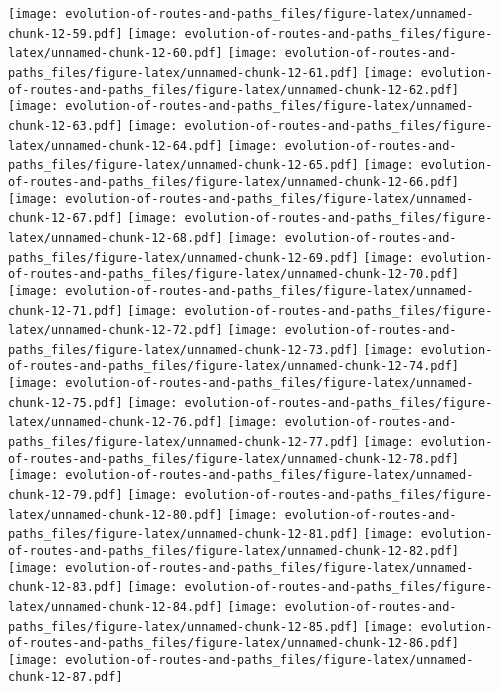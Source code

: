 \documentclass[]{elsarticle} %
\makeatletter
\def\maxwidth{\ifdim\Gin@nat@width>\linewidth\linewidth
\else\Gin@nat@width\fi}
\let\Oldincludegraphics\includegraphics
\renewcommand{\includegraphics}[1]{\Oldincludegraphics[width=\maxwidth]{#1}}
\makeatother
\begin{document}
\texttt{[image: evolution-of-routes-and-paths\_files/figure-latex/unnamed-chunk-12-59.pdf]}
\texttt{[image: evolution-of-routes-and-paths\_files/figure-latex/unnamed-chunk-12-60.pdf]}
\texttt{[image: evolution-of-routes-and-paths\_files/figure-latex/unnamed-chunk-12-61.pdf]}
\texttt{[image: evolution-of-routes-and-paths\_files/figure-latex/unnamed-chunk-12-62.pdf]}
\texttt{[image: evolution-of-routes-and-paths\_files/figure-latex/unnamed-chunk-12-63.pdf]}
\texttt{[image: evolution-of-routes-and-paths\_files/figure-latex/unnamed-chunk-12-64.pdf]}
\texttt{[image: evolution-of-routes-and-paths\_files/figure-latex/unnamed-chunk-12-65.pdf]}
\texttt{[image: evolution-of-routes-and-paths\_files/figure-latex/unnamed-chunk-12-66.pdf]}
\texttt{[image: evolution-of-routes-and-paths\_files/figure-latex/unnamed-chunk-12-67.pdf]}
\texttt{[image: evolution-of-routes-and-paths\_files/figure-latex/unnamed-chunk-12-68.pdf]}
\texttt{[image: evolution-of-routes-and-paths\_files/figure-latex/unnamed-chunk-12-69.pdf]}
\texttt{[image: evolution-of-routes-and-paths\_files/figure-latex/unnamed-chunk-12-70.pdf]}
\texttt{[image: evolution-of-routes-and-paths\_files/figure-latex/unnamed-chunk-12-71.pdf]}
\texttt{[image: evolution-of-routes-and-paths\_files/figure-latex/unnamed-chunk-12-72.pdf]}
\texttt{[image: evolution-of-routes-and-paths\_files/figure-latex/unnamed-chunk-12-73.pdf]}
\texttt{[image: evolution-of-routes-and-paths\_files/figure-latex/unnamed-chunk-12-74.pdf]}
\texttt{[image: evolution-of-routes-and-paths\_files/figure-latex/unnamed-chunk-12-75.pdf]}
\texttt{[image: evolution-of-routes-and-paths\_files/figure-latex/unnamed-chunk-12-76.pdf]}
\texttt{[image: evolution-of-routes-and-paths\_files/figure-latex/unnamed-chunk-12-77.pdf]}
\texttt{[image: evolution-of-routes-and-paths\_files/figure-latex/unnamed-chunk-12-78.pdf]}
\texttt{[image: evolution-of-routes-and-paths\_files/figure-latex/unnamed-chunk-12-79.pdf]}
\texttt{[image: evolution-of-routes-and-paths\_files/figure-latex/unnamed-chunk-12-80.pdf]}
\texttt{[image: evolution-of-routes-and-paths\_files/figure-latex/unnamed-chunk-12-81.pdf]}
\texttt{[image: evolution-of-routes-and-paths\_files/figure-latex/unnamed-chunk-12-82.pdf]}
\texttt{[image: evolution-of-routes-and-paths\_files/figure-latex/unnamed-chunk-12-83.pdf]}
\texttt{[image: evolution-of-routes-and-paths\_files/figure-latex/unnamed-chunk-12-84.pdf]}
\texttt{[image: evolution-of-routes-and-paths\_files/figure-latex/unnamed-chunk-12-85.pdf]}
\texttt{[image: evolution-of-routes-and-paths\_files/figure-latex/unnamed-chunk-12-86.pdf]}
\texttt{[image: evolution-of-routes-and-paths\_files/figure-latex/unnamed-chunk-12-87.pdf]}
\end{document}

